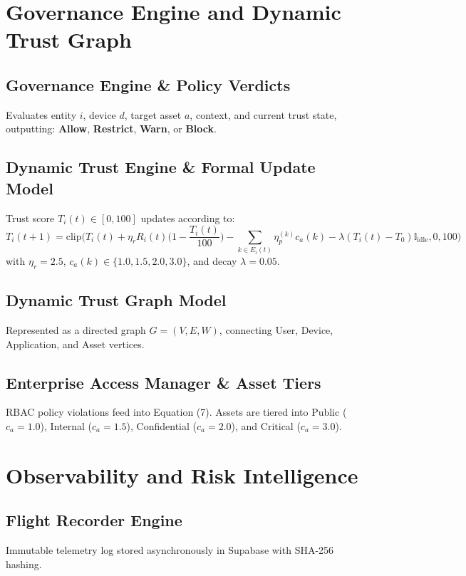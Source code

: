 \documentclass[conference]{IEEEtran}
\begin{document}
\section{Governance Engine and Dynamic Trust Graph}
\subsection{Governance Engine \& Policy Verdicts}
Evaluates entity $i$, device $d$, target asset $a$, context, and current trust state, outputting: \textbf{Allow}, \textbf{Restrict}, \textbf{Warn}, or \textbf{Block}.

\subsection{Dynamic Trust Engine \& Formal Update Model}
Trust score $T_i(t) \in [0, 100]$ updates according to:
\begin{equation}
T_i(t+1) = \text{clip}\Big( T_i(t) + \eta_r R_i(t) \big(1 - \frac{T_i(t)}{100}\big) - \sum_{k \in E_i(t)} \eta_p^{(k)} c_a(k) - \lambda (T_i(t) - T_0) \mathbb{I}_{\text{idle}}, 0, 100 \Big)
\end{equation}
with $\eta_r = 2.5$, $c_a(k) \in \{1.0, 1.5, 2.0, 3.0\}$, and decay $\lambda = 0.05$.

\subsection{Dynamic Trust Graph Model}
Represented as a directed graph $G = (V, E, W)$, connecting User, Device, Application, and Asset vertices.

\subsection{Enterprise Access Manager \& Asset Tiers}
RBAC policy violations feed into Equation (7). Assets are tiered into Public ($c_a=1.0$), Internal ($c_a=1.5$), Confidential ($c_a=2.0$), and Critical ($c_a=3.0$).

\section{Observability and Risk Intelligence}
\subsection{Flight Recorder Engine}
Immutable telemetry log stored asynchronously in Supabase with SHA-256 hashing.
\end{document}
